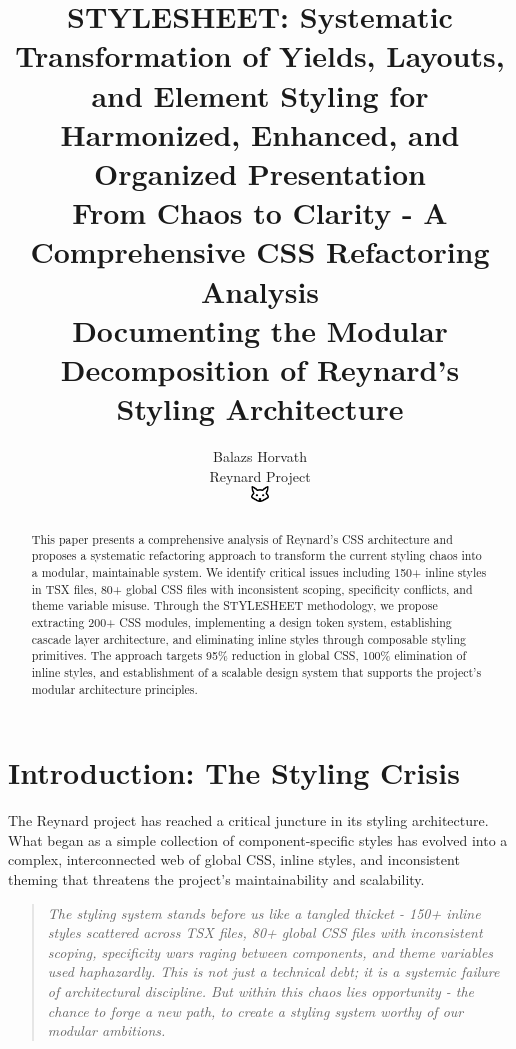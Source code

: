 \documentclass[11pt]{article}
\begin{document}
\title{\textbf{STYLESHEET: Systematic Transformation of Yields, Layouts, and Element Styling for Harmonized, Enhanced, and Organized Presentation} \\
\Large{From Chaos to Clarity - A Comprehensive CSS Refactoring Analysis} \\
\large{Documenting the Modular Decomposition of Reynard's Styling Architecture}}

\author{Balazs Horvath\\
Reynard Project\\
\includegraphics[width=0.5cm]{../../shared-assets/favicon.pdf}}

\maketitle

\begin{abstract}
This paper presents a comprehensive analysis of Reynard's CSS architecture and proposes a systematic refactoring approach to transform the current styling chaos into a modular, maintainable system. We identify critical issues including 150+ inline styles in TSX files, 80+ global CSS files with inconsistent scoping, specificity conflicts, and theme variable misuse. Through the STYLESHEET methodology, we propose extracting 200+ CSS modules, implementing a design token system, establishing cascade layer architecture, and eliminating inline styles through composable styling primitives. The approach targets 95\% reduction in global CSS, 100\% elimination of inline styles, and establishment of a scalable design system that supports the project's modular architecture principles.
\end{abstract}

\tableofcontents
\newpage

\section{Introduction: The Styling Crisis}

The Reynard project has reached a critical juncture in its styling architecture. What began as a simple collection of component-specific styles has evolved into a complex, interconnected web of global CSS, inline styles, and inconsistent theming that threatens the project's maintainability and scalability.

\begin{quote}
\emph{The styling system stands before us like a tangled thicket - 150+ inline styles scattered across TSX files, 80+ global CSS files with inconsistent scoping, specificity wars raging between components, and theme variables used haphazardly. This is not just a technical debt; it is a systemic failure of architectural discipline. But within this chaos lies opportunity - the chance to forge a new path, to create a styling system worthy of our modular ambitions.}
\end{quote}
\end{document}
